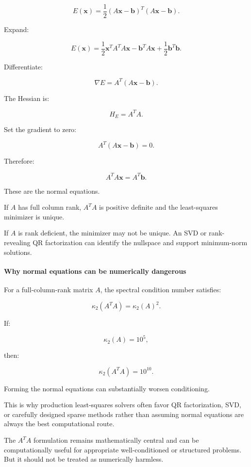 \[
E(\mathbf x)= \frac12(A\mathbf x-\mathbf b)^T(A\mathbf x-\mathbf b).
\]

Expand:

\[
E(\mathbf x) = \frac12\mathbf x^TA^TA\mathbf x -\mathbf b^TA\mathbf x +\frac12\mathbf b^T\mathbf b.
\]

Differentiate:

\[
\boxed{ \nabla E=A^T(A\mathbf x-\mathbf b) }.
\]

The Hessian is:

\[
\boxed{H_E=A^TA}.
\]

Set the gradient to zero:

\[
A^T(A\mathbf x-\mathbf b)=0.
\]

Therefore:

\[
\boxed{A^TA\mathbf x=A^T\mathbf b}.
\]

These are the normal equations.

If \(A\) has full column rank, \(A^TA\) is positive definite and the least-squares minimizer is unique.

If \(A\) is rank deficient, the minimizer may not be unique. An SVD or rank-revealing QR factorization can identify the nullspace and support minimum-norm solutions.

\paragraph{Why normal equations can be numerically dangerous}\label{02-foundations-ii-ch026-why-normal-equations-can-be-numerically-dangerous}

For a full-column-rank matrix \(A\), the spectral condition number satisfies:

\[
\boxed{ \kappa_2(A^TA)=\kappa_2(A)^2 }.
\]

If:

\[
\kappa_2(A)=10^5,
\]

then:

\[
\kappa_2(A^TA)=10^{10}.
\]

Forming the normal equations can substantially worsen conditioning.

This is why production least-squares solvers often favor QR factorization, SVD, or carefully designed sparse methods rather than assuming normal equations are always the best computational route.

The \(A^TA\) formulation remains mathematically central and can be computationally useful for appropriate well-conditioned or structured problems. But it should not be treated as numerically harmless.

